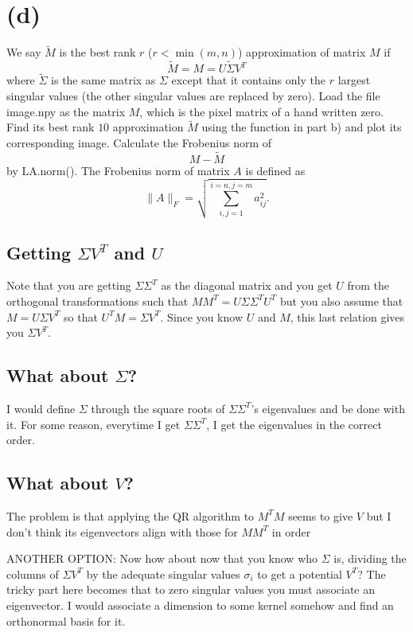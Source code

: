 \documentclass[11.5pt]{article}
\theoremstyle{definition}
\begin{document}
\section*{(d)}
We say $\tilde{M}$ is the best rank $r$ ($r<\min(m,n)$) approximation of matrix $M$ if 
$$
\tilde{M} = M = U \tilde{\Sigma} V^{T}
$$
where $\tilde{\Sigma}$ is the same matrix as $\Sigma$ except that it contains only the $r$ largest singular values (the other singular values are replaced by zero).
Load the file image.npy as the matrix $M$, which is the pixel matrix of a hand written zero.
Find its best rank $10$ approximation $\tilde{M}$ using the function in part b) and plot its corresponding image. 
Calculate the Frobenius norm of $$M - \tilde{M}$$ by LA.norm().
The Frobenius norm of matrix $A$ is defined as
$$
\| A \|_F = \sqrt{\sum_{i,j=1}^{i=n,j=m} a_{ij}^2}.
$$



\subsection{Getting $\Sigma V^T$ and $U$}

Note that you are getting $\Sigma\Sigma^T$ as the diagonal matrix and you get $U$ from the orthogonal transformations such that $MM^T=U\Sigma\Sigma^TU^T$ but you also assume that $M=U\Sigma V^T$ so that $U^T M=\Sigma V^T$. Since you know $U$ and $M$, this last relation gives you $\Sigma V^T$.

\subsection{What about $\Sigma$?}
I would define $\Sigma$ through the square roots of $\Sigma\Sigma^T$'s eigenvalues and be done with it. For some reason, everytime I get $\Sigma\Sigma^T$, I get the eigenvalues in the correct order. 

\subsection{What about $V$?}
The problem is that applying the QR algorithm to $M^TM$ seems to give $V$ but I don't think its eigenvectors align with those for $MM^T$ in order 


ANOTHER OPTION: Now how about now that you know who $\Sigma$ is, dividing the columns of $\Sigma V^T$ by the adequate singular values $\sigma_i$ to get a potential $V^T$? The tricky part here becomes that to zero singular values you must associate an eigenvector. I would associate a dimension to some kernel somehow and find an orthonormal basis for it. 
\end{document}
